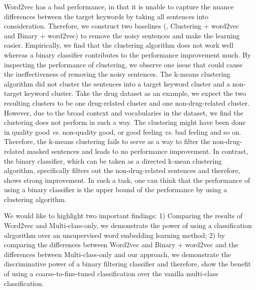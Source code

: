 Word2vec has a bad performance, in that it is unable to capture the nuance differences between the target keywords by taking all sentences into consideration. 
Therefore, we construct two baselines (\ie, Clustering + word2vec and Binary + word2vec) to remove the noisy sentences and make the learning easier. 
Empirically, we find that the clustering algorithm does not work well whereas a binary classifier contributes to the performance improvement much. 
By inspecting the performance of clustering, we observe one issue that could cause the ineffectiveness of removing the noisy sentences. 
The k-means clustering algorithm did not cluster the sentences into a target keyword cluster and a non-target keyword cluster. Take the drug dataset as an example, we expect the two resulting clusters to be one drug-related cluster and one non-drug-related cluster. However, due to the broad context and vocabularies in the dataset, we find the clustering does not perform in such a way. The clustering might have been done in quality good \textit{vs.} non-quality good, or good feeling \textit{vs.} bad feeling and so on. Therefore, the k-means clustering fails to serve as a way to filter the non-drug-related masked sentences and leads to no performance improvement. 
In contrast, the binary classifier, which can be taken as a directed k-mean clustering algorithm, specifically filters out the non-drug-related sentences and therefore, shows strong improvement. 
In such a task, one can think that the performance of using a binary classifier is the upper bound of the performance by using a clustering algorithm. 


We would like to highlight two important findings: 
1) Comparing the results of Word2vec and Multi-class-only, we demonstrate the power of using a classification alrgorithm over an unsupervised word embedding learning method; 
2) by comparing the differences between Word2vec and Binary + word2vec and the differences between Multi-class-only and our approach, we demonstrate the discriminative power of a binary filtering classifier and therefore, show the benefit of using a coarse-to-fine-tuned classification over the vanilla multi-class classification. 



